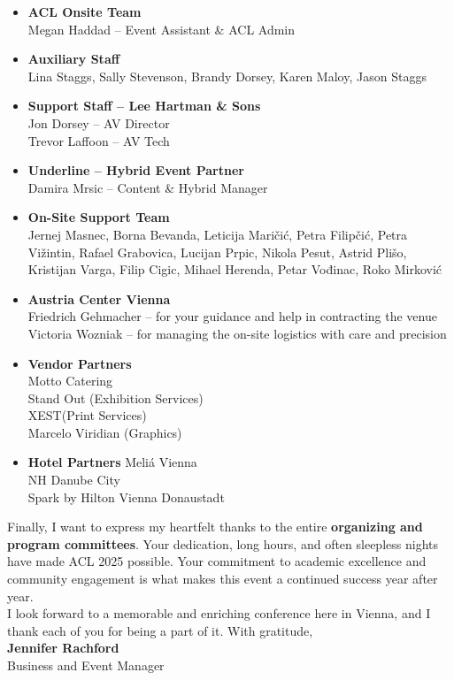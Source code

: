 \begin{itemize}

\item \textbf{ACL Onsite Team}\\
 Megan Haddad – Event Assistant \& ACL Admin


\item \textbf{Auxiliary Staff}\\
 Lina Staggs, Sally Stevenson, Brandy Dorsey, Karen Maloy, Jason Staggs


\item \textbf{Support Staff – Lee Hartman \& Sons}\\
 Jon Dorsey – AV Director\\
 Trevor Laffoon – AV Tech


\item \textbf{Underline – Hybrid Event Partner}\\
 Damira Mrsic – Content \& Hybrid Manager


\item \textbf{On-Site Support Team}\\
 Jernej Masnec, Borna Bevanda, Leticija Maričić, Petra Filipčić, Petra Vižintin, Rafael Grabovica, Lucijan Prpic, Nikola Pesut, Astrid Plišo, Kristijan Varga, Filip Cigic, Mihael Herenda, Petar Vođinac, Roko Mirković


\item \textbf{Austria Center Vienna}\\
 Friedrich Gehmacher – for your guidance and help in contracting the venue\\
 Victoria Wozniak – for managing the on-site logistics with care and precision


\item \textbf{Vendor Partners}\\
 Motto Catering\\
 Stand Out (Exhibition Services)\\
 XEST(Print Services)\\
 Marcelo Viridian (Graphics)

\item \textbf{Hotel Partners}
 Meliá Vienna\\
 NH Danube City\\
 Spark by Hilton Vienna Donaustadt

\end{itemize}

Finally, I want to express my heartfelt thanks to the entire \textbf{organizing and program committees}. Your dedication, long hours, and often sleepless nights have made ACL 2025 possible. Your commitment to academic excellence and community engagement is what makes this event a continued success year after year.\\

I look forward to a memorable and enriching conference here in Vienna, and I thank each of you for being a part of it.
With gratitude,\\


\textbf{Jennifer Rachford}\\
Business and Event Manager
